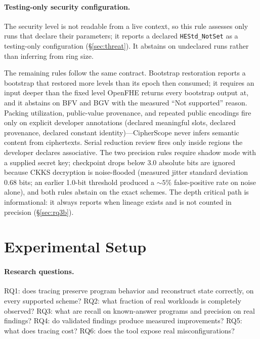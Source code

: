 \documentclass[sigconf,nonacm]{acmart}
\begin{document}
\paragraph{Testing-only security configuration.} The security level is not
readable from a live context, so this rule assesses only runs that declare
their parameters; it reports a declared \texttt{HEStd\_NotSet} as a
testing-only configuration (\S\ref{sec:threat}). It abstains on undeclared
runs rather than inferring from ring size.

The remaining rules follow the same contract. Bootstrap restoration reports
a bootstrap that restored more levels than its epoch then consumed; it
requires an input deeper than the fixed level OpenFHE returns every
bootstrap output at, and it abstains on BFV and BGV with the measured ``Not
supported'' reason. Packing utilization, public-value provenance, and
repeated public encodings fire only on explicit developer annotations
(declared meaningful slots, declared provenance, declared constant
identity)---CipherScope never infers semantic content from ciphertexts.
Serial reduction review fires only inside regions the developer declares
associative. The two precision rules require shadow mode with a supplied
secret key; checkpoint drops below 3.0 absolute bits are ignored because
CKKS decryption is noise-flooded (measured jitter standard deviation 0.68
bits; an earlier 1.0-bit threshold produced a ${\sim}5\%$ false-positive
rate on noise alone), and both rules abstain on the exact schemes. The depth
critical path is informational: it always reports when lineage exists and is
not counted in precision (\S\ref{sec:rq3b}).

\section{Experimental Setup}
\label{sec:setup}

\paragraph{Research questions.} RQ1: does tracing preserve program behavior
and reconstruct state correctly, on every supported scheme? RQ2: what
fraction of real workloads is completely observed? RQ3: what are recall on
known-answer programs and precision on real findings? RQ4: do validated
findings produce measured improvements? RQ5: what does tracing cost? RQ6:
does the tool expose real misconfigurations?
\end{document}
